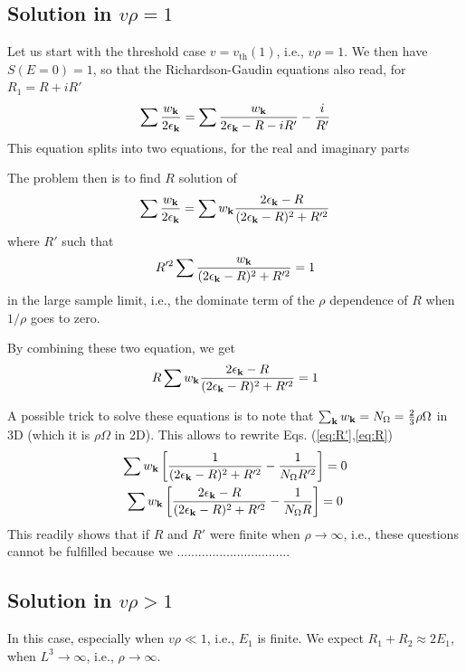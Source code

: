 \documentclass{article}
\begin{document}
\subsection{Solution in $v\rho=1$}
Let us start with the threshold case $v=v_{\text{th}}(1)$, i.e., $v\rho=1$.  We then have $S(E=0)=1$, so that the Richardson-Gaudin equations also read, for $R_1=R+iR'$
\begin{equation}
\sum\frac{w_{\mathbf{k}}}{2\epsilon_{\mathbf{k}}}=\sum\frac{w_{\mathbf{k}}}{2\epsilon_{\mathbf{k}}-R-iR'}-\frac{i}{R'}
\label{eq:}
\end{equation}
This equation splits into two equations, for the real and imaginary parts

The problem then is to find $R$ solution of 
\begin{equation}
\sum\frac{w_{\mathbf{k}}}{2\epsilon_{\mathbf{k}}}=\sum{}w_{\mathbf{k}}\frac{2\epsilon_{\mathbf{k}}-R}{(2\epsilon_{\mathbf{k}}-R)^2+R'^2}
\label{eq:}
\end{equation}
where $R'$ such that 
\begin{equation}
R'^2\sum{}\frac{w_{\mathbf{k}}}{(2\epsilon_{\mathbf{k}}-R)^2+R'^2}=1
\label{eq:R'}
\end{equation}
in the large sample limit, i.e., the dominate term of the $\rho$ dependence of $R$ when $1/\rho$ goes to zero. 

By combining these two equation, we get
\begin{equation}
R\sum{}w_{\mathbf{k}}\frac{2\epsilon_{\mathbf{k}}-R}{(2\epsilon_{\mathbf{k}}-R)^2+R'^2}=1
\label{eq:R}
\end{equation}

A possible trick to solve these equations is to note that $\sum_{\mathbf{k}}{}w_{\mathbf{k}}=N_\Omega=\frac23\rho\Omega$ in 3D (which it is $\rho\Omega$ in 2D).  This allows to rewrite Eqs. (\ref{eq:R'},\ref{eq:R})
\begin{gather}
\sum{}w_{\mathbf{k}}\left[\frac{1}{(2\epsilon_{\mathbf{k}}-R)^2+R'^2}-\frac{1}{N_\Omega{}R'^2}\right]=0\\
\sum{}w_{\mathbf{k}}\left[\frac{2\epsilon_{\mathbf{k}}-R}{(2\epsilon_{\mathbf{k}}-R)^2+R'^2}-\frac{1}{N_\Omega{}R}\right]=0
\end{gather}
This readily shows that if $R$ and $R'$ were finite when $\rho\rightarrow\infty$, i.e., these questions cannot be fulfilled because we 
................................


\subsection{Solution in $v\rho>1$}
In this case, especially when $v\rho\ll1$, i.e., $E_1$ is finite. We expect $R_1+R_2\approx2E_1$, when $L^3\rightarrow\infty$, i.e., $\rho\rightarrow\infty$.  
\end{document}
